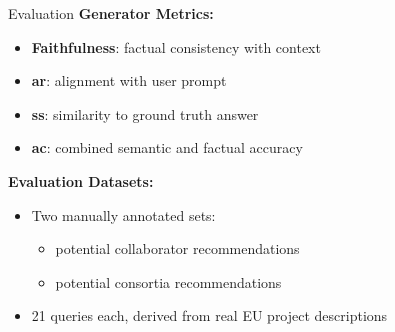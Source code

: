 \begin{tframe}{Evaluation}
\textbf{Generator Metrics:}
    \begin{itemize}
    \item \textbf{Faithfulness}: factual consistency with context
    \item \textbf{\gls{ar}}: alignment with user prompt
    \item \textbf{\gls{ss}}: similarity to ground truth answer
    \item \textbf{\gls{ac}}: combined semantic and factual accuracy
    \end{itemize}

    \textbf{Evaluation Datasets:}
    \begin{itemize}
    \item Two manually annotated sets:
        \begin{itemize}
            \item potential collaborator recommendations
            \item potential consortia recommendations
        \end{itemize}
    \item 21 queries each, derived from real EU project descriptions
    \end{itemize}
\end{tframe}